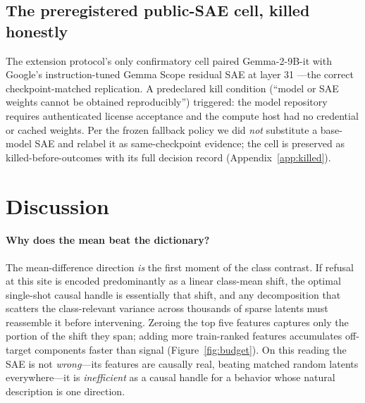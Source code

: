 \documentclass[11pt]{article}
\begin{document}
\subsection{The preregistered public-SAE cell, killed honestly}
\label{sec:killed}

The extension protocol's only confirmatory cell paired Gemma-2-9B-it
\citep{gemmateam2024gemma2} with Google's instruction-tuned Gemma Scope
residual SAE at layer 31 \citep{lieberum2024gemmascope}---the correct
checkpoint-matched replication.  A predeclared kill condition (``model or SAE
weights cannot be obtained reproducibly'') triggered: the model repository
requires authenticated license acceptance and the compute host had no
credential or cached weights.  Per the frozen fallback policy we did
\emph{not} substitute a base-model SAE and relabel it as same-checkpoint
evidence; the cell is preserved as killed-before-outcomes with its full
decision record (Appendix~\ref{app:killed}).

\section{Discussion}
\label{sec:discussion}

\paragraph{Why does the mean beat the dictionary?}
The mean-difference direction \emph{is} the first moment of the class
contrast.  If refusal at this site is encoded predominantly as a linear
class-mean shift, the optimal single-shot causal handle is essentially that
shift, and any decomposition that scatters the class-relevant variance across
thousands of sparse latents must reassemble it before intervening.  Zeroing
the top five features captures only the portion of the shift they span;
adding more train-ranked features accumulates off-target components faster
than signal (Figure~\ref{fig:budget}).  On this reading the SAE is not
\emph{wrong}---its features are causally real, beating matched random latents
everywhere---it is \emph{inefficient} as a causal handle for a behavior whose
natural description is one direction.
\end{document}
